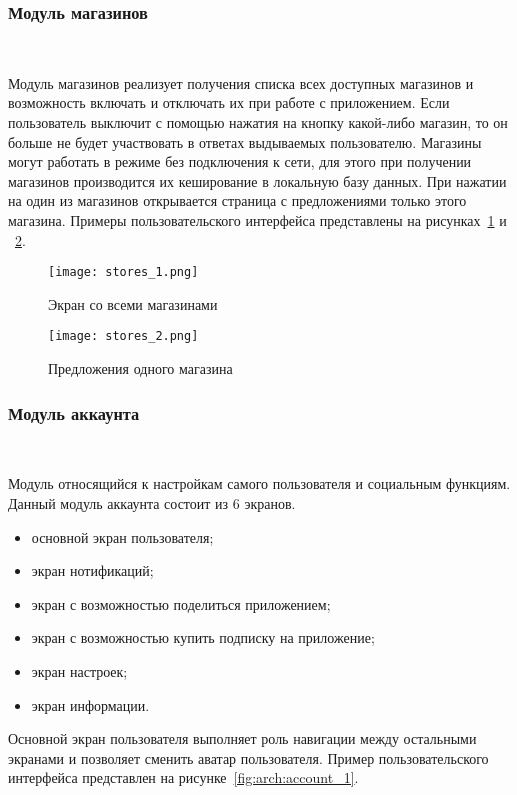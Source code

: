 \subsubsection{Модуль магазинов}~\par
Модуль магазинов реализует получения списка всех доступных магазинов и возможность включать и отключать их при работе с приложением. Если пользователь выключит с помощью нажатия на кнопку какой-либо магазин, то он больше не будет участвовать в ответах выдываемых пользователю. Магазины могут работать в режиме без подключения к сети, для этого при получении магазинов производится их кеширование в локальную базу данных. При нажатии на один из магазинов открывается страница с предложениями только этого магазина. Примеры пользовательского интерфейса представлены на рисунках~\ref{fig:arch:stores_1} и ~\ref{fig:arch:stores_2}.

\begin{figure}[H]
 \centering
   \texttt{[image: stores\_1.png]} 
   \caption{Экран со всеми магазинами}
   \label{fig:arch:stores_1}
\end{figure}

\begin{figure}[H]
 \centering
   \texttt{[image: stores\_2.png]} 
   \caption{Предложения одного магазина}
   \label{fig:arch:stores_2}
\end{figure}

\subsubsection{Модуль аккаунта}~\par
Модуль относящийся к настройкам самого пользователя и социальным функциям. Данный модуль аккаунта состоит из 6 экранов.

\begin{itemize}
    \item основной экран пользователя;
    \item экран нотификаций;
    \item экран с возможностью поделиться приложением;
    \item экран с возможностью купить подписку на приложение;
    \item экран настроек;
    \item экран информации.
\end{itemize}

Основной экран пользователя выполняет роль навигации между остальными экранами и позволяет сменить аватар пользователя. Пример пользовательского интерфейса представлен на рисунке~\ref{fig:arch:account_1}.

